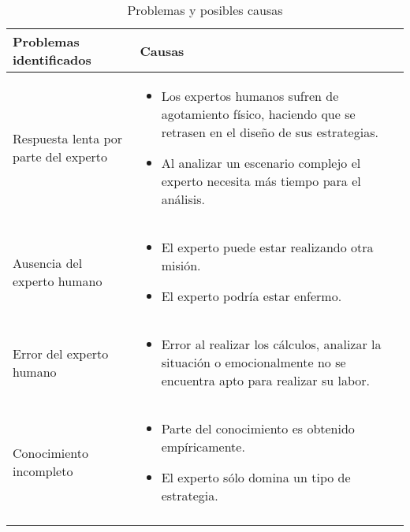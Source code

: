 \begin{longtable}[H]{p{}|p{}}
  \textbf{Problemas identificados} &  \textbf{Causas}\\\toprule
  \endhead


  Respuesta lenta por parte del experto &
  \begin{minipage}{.53\textwidth}
    \begin{itemize}
    \item Los expertos humanos sufren de agotamiento físico, haciendo que se retrasen en el diseño de sus estrategias.
    \item Al analizar un escenario complejo el experto necesita más tiempo para el análisis.
    \end{itemize}
  \end{minipage}
  \\\midrule


  Ausencia del experto humano &
  \begin{minipage}{.53\textwidth}
    \begin{itemize}
    \item El experto puede estar realizando otra misión.
    \item El experto podría estar enfermo.
    \end{itemize}
  \end{minipage}
  \\\midrule


  Error del experto humano &
  \begin{minipage}{.53\textwidth}
    \begin{itemize}
    \item Error al realizar los cálculos, analizar la situación o emocionalmente no se encuentra apto para realizar su labor.
    \end{itemize}
  \end{minipage}
  \\\midrule


  Conocimiento incompleto &
  \begin{minipage}{.53\textwidth}
    \begin{itemize}
    \item Parte del conocimiento es obtenido empíricamente.
    \item El experto sólo domina un tipo de estrategia.
    \end{itemize}
  \end{minipage}
  \\\bottomrule
  \caption{Problemas y posibles causas}
  \label{cuadro:problemasyposiblescausas}
\end{longtable} 

